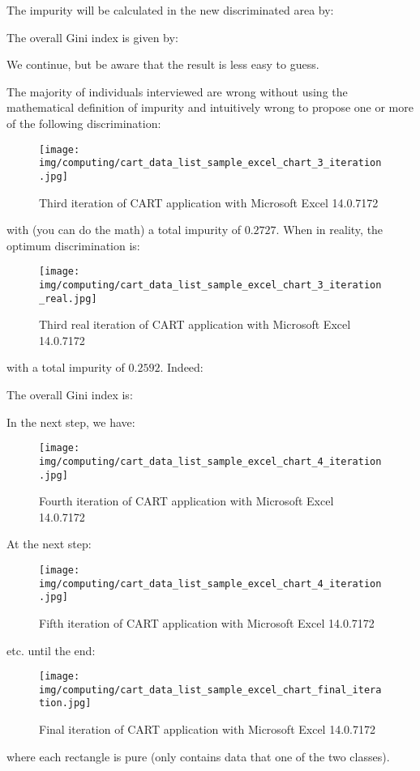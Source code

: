 	The impurity will be calculated in the new discriminated area by:
	
	The overall Gini index is given by:
	
	We continue, but be aware that the result is less easy to guess. 

	The majority of individuals interviewed are wrong without using the mathematical definition of impurity and intuitively wrong to propose one or more of the following discrimination:
	\begin{figure}[H]
		\centering
		\texttt{[image: img/computing/cart\_data\_list\_sample\_excel\_chart\_3\_iteration.jpg]}
		\caption[]{Third iteration of CART application with Microsoft Excel 14.0.7172}
	\end{figure}
	with (you can do the math) a total impurity of $0.2727$. When in reality, the optimum discrimination is:
	\begin{figure}[H]
		\centering
		\texttt{[image: img/computing/cart\_data\_list\_sample\_excel\_chart\_3\_iteration\_real.jpg]}
		\caption[]{Third real iteration of CART application with Microsoft Excel 14.0.7172}
	\end{figure}
	with a total impurity of $0.2592$. Indeed:
	
	The overall Gini index is:
	
	In the next step, we have:
	\begin{figure}[H]
		\centering
		\texttt{[image: img/computing/cart\_data\_list\_sample\_excel\_chart\_4\_iteration.jpg]}
		\caption[]{Fourth iteration of CART application with Microsoft Excel 14.0.7172}
	\end{figure}
	At the next step:
	\begin{figure}[H]
		\centering
		\texttt{[image: img/computing/cart\_data\_list\_sample\_excel\_chart\_4\_iteration.jpg]}
		\caption[]{Fifth iteration of CART application with Microsoft Excel 14.0.7172}
	\end{figure}
	etc. until the end:
	\begin{figure}[H]
		\centering
		\texttt{[image: img/computing/cart\_data\_list\_sample\_excel\_chart\_final\_iteration.jpg]}
		\caption[]{Final iteration of CART application with Microsoft Excel 14.0.7172}
	\end{figure}
	where each rectangle is pure (only contains data that one of the two classes).

